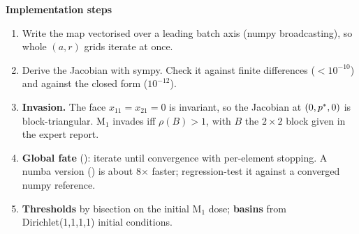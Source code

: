 \textbf{Implementation steps}
\begin{enumerate}
\item Write the map vectorised over a leading batch axis (numpy broadcasting), so whole $(a,r)$ grids iterate at once.
\item Derive the Jacobian with sympy. Check it against finite differences ($<10^{-10}$) and against the closed form ($10^{-12}$).
\item \textbf{Invasion.} The face $x_{11}=x_{21}=0$ is invariant, so the Jacobian at $(0,p^{*},0)$ is block-triangular. M$_1$ invades iff $\rho(B)>1$, with $B$ the $2\times2$ block given in the expert report.
\item \textbf{Global fate} (): iterate until convergence with per-element stopping. A numba version () is about 8$\times$ faster; regression-test it against a converged numpy reference.
\item \textbf{Thresholds} by bisection on the initial M$_1$ dose; \textbf{basins} from Dirichlet(1,1,1,1) initial conditions.
\end{enumerate}

